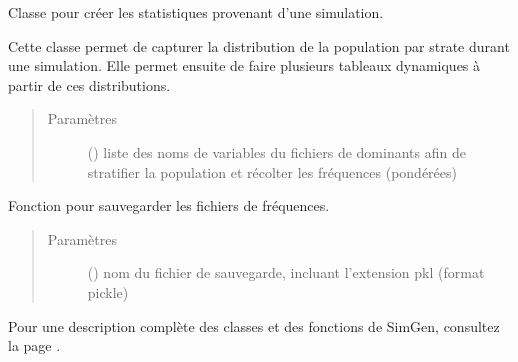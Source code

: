 \documentclass[letterpaper,10pt,french]{sphinxmanual}
\begin{document}
\begin{fulllineitems}
\label{\detokenize{utilisation:id8}}
Classe pour créer les statistiques provenant d’une simulation.

Cette classe permet de capturer la distribution de la population par strate durant une simulation. Elle permet ensuite de faire plusieurs tableaux dynamiques à partir de ces distributions.
\begin{quote}\begin{description}
\item[{Paramètres}] \leavevmode
{} () \textendash{} liste des noms de variables du fichiers de dominants afin de stratifier la population et récolter les fréquences (pondérées)

\end{description}\end{quote}

\begin{fulllineitems}
\label{\detokenize{utilisation:simgen.statistics.save}}
Fonction pour sauvegarder les fichiers de fréquences.
\begin{quote}\begin{description}
\item[{Paramètres}] \leavevmode
{} () \textendash{} nom du fichier de sauvegarde, incluant l’extension pkl (format pickle)

\end{description}\end{quote}

\end{fulllineitems}


\end{fulllineitems}


\begin{DUlineblock}{0em}
\item[] 
\end{DUlineblock}

Pour une description complète des classes et des fonctions de SimGen, consultez la page {\hyperref[\detokenize{code:code}]{}}.
\end{document}
